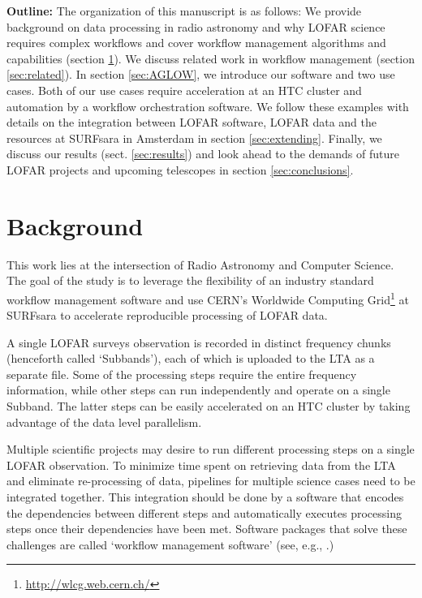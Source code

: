 \textbf{Outline:}
The organization of this manuscript is as follows: We provide background on data processing in radio astronomy and why LOFAR science requires complex workflows and cover workflow management algorithms and capabilities (section \ref{sec:background}). We discuss related work in workflow management (section \ref{sec:related}). In section \ref{sec:AGLOW}, we introduce our software and two use cases. Both of our use cases require acceleration at an HTC cluster and automation by a workflow orchestration software. We follow these examples with details on the integration between LOFAR software, LOFAR data and the resources at SURFsara in Amsterdam in section \ref{sec:extending}. Finally, we discuss our results (sect. \ref{sec:results}) and look ahead to the demands of future LOFAR projects and upcoming telescopes in section \ref{sec:conclusions}. 

\section{Background}\label{sec:background}

This work lies at the intersection of Radio Astronomy and Computer Science. The goal of the study is to leverage the flexibility of an industry standard workflow management software and use CERN's Worldwide Computing Grid\footnote{\url{http://wlcg.web.cern.ch/}} at SURFsara \cite{grid} to accelerate reproducible processing of LOFAR data. 


A single LOFAR surveys observation is recorded in distinct frequency chunks (henceforth called `\Glspl{Subband}'), each of which is uploaded to the LTA as a separate file. Some of the processing steps require the entire frequency information, while other steps can run independently and operate on a single Subband. The latter steps can be easily accelerated on an HTC cluster by taking advantage of the data level parallelism. 

Multiple scientific projects may desire to run different processing steps on a single LOFAR observation. To minimize time spent on retrieving data from the LTA and eliminate re-processing of data, pipelines for multiple science cases need to be integrated together. This integration should be done by a software that encodes the dependencies between different steps and automatically executes processing steps once their dependencies have been met. Software packages that solve these challenges are called `workflow management software' (see, e.g., \cite{workflow1,workflow2,workflow3}.)

